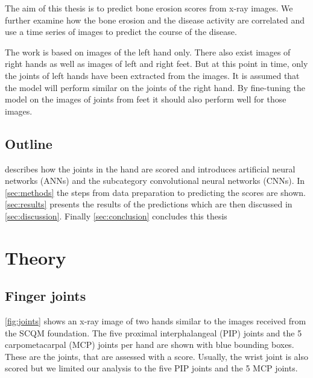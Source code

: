 \documentclass[12pt]{article}
\begin{document}
The aim of this thesis is to predict bone erosion scores from x-ray images. We further examine how the bone erosion and the disease activity are correlated and use a time series of images to predict the course of the disease.

The work is based on images of the left hand only. There also exist images of right hands as well as images of left and right feet. But at this point in time, only the joints of left hands have been extracted from the images. It is assumed that the model will perform similar on the joints of the right hand. By fine-tuning the model on the images of joints from feet it should also perform well for those images.

\subsection{Outline}

 describes how the joints in the hand are scored and introduces artificial neural networks (ANNs) and the subcategory convolutional neural networks (CNNs). In \autoref{sec:methods} the steps from data preparation to predicting the scores are shown. \autoref{sec:results} presents the results of the predictions which are then discussed in \autoref{sec:discussion}. Finally \autoref{sec:conclusion} concludes this thesis



\newpage

\section{Theory}
\label{sec:theory}

\subsection{Finger joints}
\label{subsec:joints}

\autoref{fig:joints} shows an x-ray image of two hands similar to the images received from the SCQM foundation. The five proximal interphalangeal (PIP) joints and the 5 carpometacarpal (MCP) joints per hand are shown with blue bounding boxes. These are the joints, that are assessed with a score. Usually, the wrist joint is also scored but we limited our analysis to the five PIP joints and the 5 MCP joints.
\end{document}
